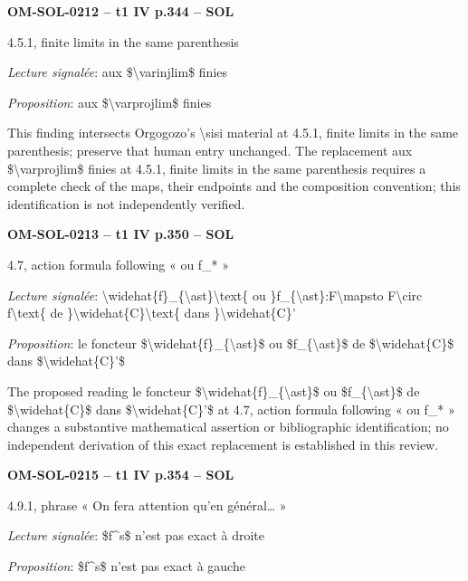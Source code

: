 \par\noindent\textbf{OM-SOL-0212 -- t1 IV p.344 -- SOL}\par
4.5.1, finite limits in the same parenthesis\par
\emph{Lecture signalée}: aux \$\textbackslash{}varinjlim\$ finies\par
\emph{Proposition}: aux \$\textbackslash{}varprojlim\$ finies\par
This finding intersects Orgogozo's \textbackslash{}sisi material at 4.5.1, finite limits in the same parenthesis; preserve that human entry unchanged. The replacement aux \$\textbackslash{}varprojlim\$ finies at 4.5.1, finite limits in the same parenthesis requires a complete check of the maps, their endpoints and the composition convention; this identification is not independently verified.\par
\par\noindent\textbf{OM-SOL-0213 -- t1 IV p.350 -- SOL}\par
4.7, action formula following « ou f\_* »\par
\emph{Lecture signalée}: \textbackslash{}widehat\{f\}\_\{\textbackslash{}ast\}\textbackslash{}text\{ ou \}f\_\{\textbackslash{}ast\}:F\textbackslash{}mapsto F\textbackslash{}circ f\textbackslash{}text\{ de \}\textbackslash{}widehat\{C\}\textbackslash{}text\{ dans \}\textbackslash{}widehat\{C\}'\par
\emph{Proposition}: le foncteur \$\textbackslash{}widehat\{f\}\_\{\textbackslash{}ast\}\$ ou \$f\_\{\textbackslash{}ast\}\$ de \$\textbackslash{}widehat\{C\}\$ dans \$\textbackslash{}widehat\{C\}'\$\par
The proposed reading le foncteur \$\textbackslash{}widehat\{f\}\_\{\textbackslash{}ast\}\$ ou \$f\_\{\textbackslash{}ast\}\$ de \$\textbackslash{}widehat\{C\}\$ dans \$\textbackslash{}widehat\{C\}'\$ at 4.7, action formula following « ou f\_* » changes a substantive mathematical assertion or bibliographic identification; no independent derivation of this exact replacement is established in this review.\par
\par\noindent\textbf{OM-SOL-0215 -- t1 IV p.354 -- SOL}\par
4.9.1, phrase « On fera attention qu'en général… »\par
\emph{Lecture signalée}: \$f\textasciicircum{}s\$ n'est pas exact à droite\par
\emph{Proposition}: \$f\textasciicircum{}s\$ n'est pas exact à gauche\par
